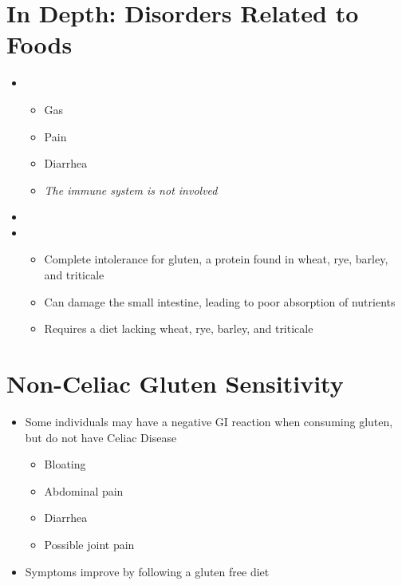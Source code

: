 \documentclass[title={Chapter 3}]{fdsn201notes}
\begin{document}
\section{In Depth: Disorders Related to Foods}\label{sec:in-depth:-disorders-related-to-foods}
\begin{itemize}
	\item {}
	\begin{itemize}
		\item Gas
		\item Pain
		\item Diarrhea
		\item \emph{The immune system is not involved}
	\end{itemize}
	\item {}
	\item {}
	\begin{itemize}
		\item Complete intolerance for gluten, a protein found in wheat, rye, barley, and triticale
		\item Can damage the small intestine, leading to poor absorption of nutrients
		\item Requires a diet lacking wheat, rye, barley, and triticale
	\end{itemize}
\end{itemize}

\section{Non-Celiac Gluten Sensitivity}\label{sec:non-celiac-gluten-sensitivity}
\begin{itemize}
	\item Some individuals may have a negative GI reaction when consuming gluten, but do not have Celiac Disease
	\begin{itemize}
		\item Bloating
		\item Abdominal pain
		\item Diarrhea
		\item Possible joint pain
	\end{itemize}
	\item Symptoms improve by following a gluten free diet
\end{itemize}
\end{document}
